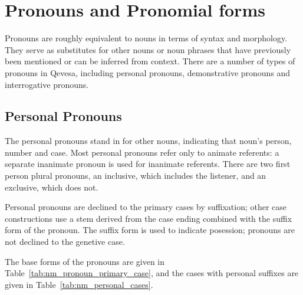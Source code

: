 \documentclass[grammar]{subfiles}
\begin{document}



  \section{Pronouns and Pronomial forms}
  \label{sec:nm_pronouns}

  Pronouns are roughly equivalent to nouns in terms of syntax and morphology.
  They serve as substitutes for other nouns or noun phrases that have
  previously been mentioned or can be inferred from context.  There are a
  number of types of pronouns in Qevesa, including personal pronouns,
  demonstrative pronouns and interrogative pronouns.


  \subsection{Personal Pronouns}
  \label{ssec:nm_personal_pronouns}

  The personal pronouns stand in for other nouns, indicating that noun's
  person, number and case.  Most personal pronouns refer only to animate
  referents: a separate inanimate pronoun is used for inanimate referents.
  There are two first person plural pronouns, an inclusive, which includes the
  listener, and an exclusive, which does not. 

  Personal pronouns are declined to the primary cases by suffixation; other
  case constructions use a stem derived from the case ending combined with the
  suffix form of the pronoun.  The suffix form is used to indicate posession;
  pronouns are not declined to the genetive case.  

  The base forms of the pronouns are given in
  Table~\ref{tab:nm_pronoun_primary_case}, and the cases with personal suffixes
  are given in Table~\ref{tab:nm_personal_cases}.
\end{document}
